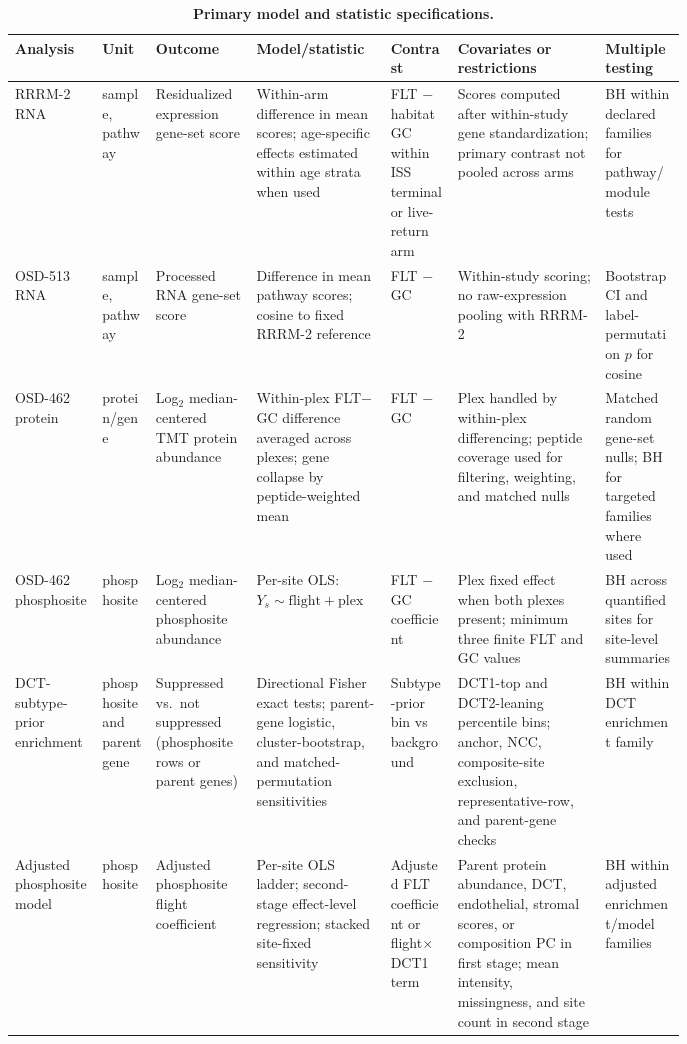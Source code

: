 \documentclass[11pt]{article}
\begin{document}
\begin{landscape}
\begin{table}[p]
\centering\tiny
\caption{\textbf{Primary model and statistic specifications.}}
\label{tab:modelspec}
\renewcommand{\arraystretch}{0.98}
\begin{tabularx}{\linewidth}{p{0.13\linewidth}p{0.08\linewidth}p{0.15\linewidth}p{0.20\linewidth}p{0.10\linewidth}Yp{0.12\linewidth}}
\toprule
Analysis & Unit & Outcome & Model/statistic & Contrast & Covariates or restrictions & Multiple testing \\
\midrule
RRRM-2 RNA & sample, pathway & Residualized expression gene-set score & Within-arm difference in mean scores; age-specific effects estimated within age strata when used & FLT $-$ habitat GC within ISS terminal or live-return arm & Scores computed after within-study gene standardization; primary contrast not pooled across arms & BH within declared families for pathway/module tests \\
OSD-513 RNA & sample, pathway & Processed RNA gene-set score & Difference in mean pathway scores; cosine to fixed RRRM-2 reference & FLT $-$ GC & Within-study scoring; no raw-expression pooling with RRRM-2 & Bootstrap CI and label-permutation $p$ for cosine \\
OSD-462 protein & protein/gene & Log$_2$ median-centered TMT protein abundance & Within-plex FLT$-$GC difference averaged across plexes; gene collapse by peptide-weighted mean & FLT $-$ GC & Plex handled by within-plex differencing; peptide coverage used for filtering, weighting, and matched nulls & Matched random gene-set nulls; BH for targeted families where used \\
OSD-462 phosphosite & phosphosite & Log$_2$ median-centered phosphosite abundance & Per-site OLS: $Y_s\sim \mathrm{flight}+\mathrm{plex}$ & FLT $-$ GC coefficient & Plex fixed effect when both plexes present; minimum three finite FLT and GC values & BH across quantified sites for site-level summaries \\
DCT-subtype-prior enrichment & phosphosite and parent gene & Suppressed vs.\ not suppressed (phosphosite rows or parent genes) & Directional Fisher exact tests; parent-gene logistic, cluster-bootstrap, and matched-permutation sensitivities & Subtype-prior bin vs background & DCT1-top and DCT2-leaning percentile bins; anchor, NCC, composite-site exclusion, representative-row, and parent-gene checks & BH within DCT enrichment family \\
Adjusted phosphosite model & phosphosite & Adjusted phosphosite flight coefficient & Per-site OLS ladder; second-stage effect-level regression; stacked site-fixed sensitivity & Adjusted FLT coefficient or flight$\times$DCT1 term & Parent protein abundance, DCT, endothelial, stromal scores, or composition PC in first stage; mean intensity, missingness, and site count in second stage & BH within adjusted enrichment/model families \\
\bottomrule
\end{tabularx}
\end{table}
\end{landscape}
\end{document}
